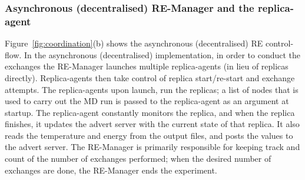 \documentclass{rspublic}
\newcommand{\jhanote}[1]{ {\textcolor{red} { ***shantenu: #1 }}}
\newcommand{\alnote}[1]{ {\textcolor{blue} { ***andre: #1 }}}
\newcommand{\alnote}[1]{}
\newcommand{\jhanote}[1]{}
\begin{document}

\subsubsection{Asynchronous (decentralised) RE-Manager and the replica-agent}

 

Figure~\ref{fig:coordination}(b) shows the asynchronous
(decentralised) RE control-flow.  In the asynchronous (decentralised)
implementation, in order to conduct the exchanges the RE-Manager
launches multiple replica-agents (in lieu of replicas directly).
Replica-agents then take control of replica start/re-start and
exchange attempts.  The replica-agents upon launch, run the replicas;
a list of nodes that is used to carry out the MD run is passed to the
replica-agent as an argument at startup.  The replica-agent constantly
monitors the replica, and when the replica finishes, it updates the
advert server with the current state of that replica.  It also reads
the temperature and energy from the output files, and posts the values
to the advert server.  The RE-Manager is primarily responsible for
keeping track and count of the number of exchanges performed; when the
desired number of exchanges are done, the RE-Manager ends the
experiment.

  
\end{document}
